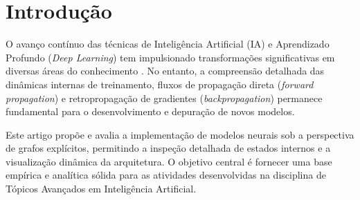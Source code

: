 ﻿\section{Introdução}
\label{sec:introducao}

O avanço contínuo das técnicas de Inteligência Artificial (IA) e Aprendizado Profundo (\textit{Deep Learning}) tem impulsionado transformações significativas em diversas áreas do conhecimento \cite{goodfellow2016deep}. No entanto, a compreensão detalhada das dinâmicas internas de treinamento, fluxos de propagação direta (\textit{forward propagation}) e retropropagação de gradientes (\textit{backpropagation}) permanece fundamental para o desenvolvimento e depuração de novos modelos.

Este artigo propõe e avalia a implementação de modelos neurais sob a perspectiva de grafos explícitos, permitindo a inspeção detalhada de estados internos e a visualização dinâmica da arquitetura. O objetivo central é fornecer uma base empírica e analítica sólida para as atividades desenvolvidas na disciplina de Tópicos Avançados em Inteligência Artificial.
